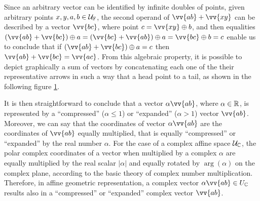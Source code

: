 Since an arbitrary vector can be identified by infinite doubles of points, given arbitrary points $x,y,a,b\in{\mathcal{U}}_{\mathbb{F}}$, the second operand of $\vv{ab}+\vv{xy}$ can be described by a vector $\vv{bc}$, where point $c=\vv{xy}\oplus b$, and then equalities $(\vv{ab}+\vv{bc})\oplus a=(\vv{bc}+\vv{ab})\oplus a=\vv{bc}\oplus b=c$ enable us to conclude that if $(\vv{ab}+\vv{bc})\oplus a=c$ then $\vv{ab}+\vv{bc}=\vv{ac}$. From this algebraic property, it is possible to depict graphically a sum of vectors by concatenating each one of the their representative arrows in such a way that a head point to a tail, as shown in the following figure \ref{fg:vetorSoma}.
\begin{figure}[!ht]
\centering
\begin{center}
\scalebox{.72}{}
\end{center}
\label{fg:vetorSoma}
\end{figure}
It is then straightforward to conclude that a vector $\alpha\vv{ab}$, where $\alpha\in\mathbb{R}$, is represented by a ``compressed'' ($\alpha\leq 1$) or ``expanded'' ($\alpha >1$) vector $\vv{ab}$. Moreover, we can say that the coordinates of vector $\alpha\vv{ab}$ are the coordinates of $\vv{ab}$ equally multiplied, that is equally ``compressed'' or ``expanded'' by the real number $\alpha$. For the case of a complex affine space ${\mathcal{U}}_{\mathbb{C}}$, the polar complex coordinates of a vector when multiplied by a complex $\alpha$ are equally multiplied by the real scalar $|\alpha|$ and equally rotated by $\arg{(\alpha)}$ on the complex plane, according to the basic theory of complex number multiplication. Therefore, in affine geometric representation, a complex vector $\alpha\vv{ab}\in U_\cam{C}$ results also in a ``compressed'' or ``expanded'' complex vector $\vv{ab}$.

